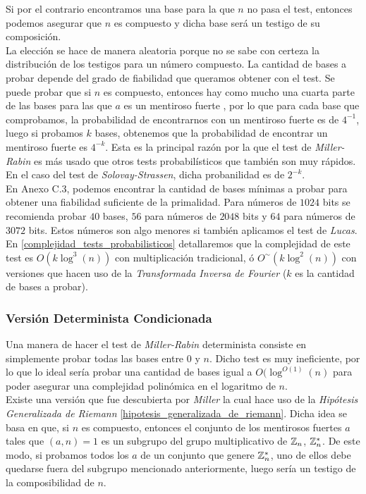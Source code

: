 Si por el contrario encontramos una base para la que $n$ no pasa el test, entonces podemos asegurar que $n$ es compuesto y dicha base será un testigo de su composición.\\

La elección se hace de manera aleatoria porque no se sabe con certeza la distribución de los testigos para un número compuesto. La cantidad de bases a probar depende del grado de fiabilidad que queramos obtener con el test. Se puede probar que si $n$ es compuesto, entonces hay como mucho una cuarta parte de las bases para las que $a$ es un mentiroso fuerte \cite{rabin_1980}, por lo que para cada base que comprobamos, la probabilidad de encontrarnos con un mentiroso fuerte es de $4^{-1}$, luego si probamos $k$ bases, obtenemos que la probabilidad de encontrar un mentiroso fuerte es $4^{-k}$. Esta es la principal razón por la que el test de \textit{Miller-Rabin} es más usado que otros tests probabilísticos que también son muy rápidos. En el caso del test de \textit{Solovay-Strassen}, dicha probanilidad es de $2^{-k}$.\\

En \cite{digital_signature_standard} Anexo C.3, podemos encontrar la cantidad de bases mínimas a probar para obtener una fiabilidad suficiente de la primalidad. Para números de $1024$ bits se recomienda probar $40$ bases, $56$ para números de $2048$ bits y $64$ para números de $3072$ bits. Estos números son algo menores si también aplicamos el test de \textit{Lucas}.\\

En \autoref{complejidad_tests_probabilisticos} detallaremos que la complejidad de este test es $O(k\log^3(n))$ con multiplicación tradicional, ó $O^\sim(k\log^2(n))$ con versiones que hacen uso de la \textit{Transformada Inversa de Fourier} ($k$ es la cantidad de bases a probar).

\subsubsection{Versión Determinista Condicionada}

Una manera de hacer el test de \textit{Miller-Rabin} determinista consiste en simplemente probar todas las bases entre $0$ y $n$. Dicho test es muy ineficiente, por lo que lo ideal sería probar una cantidad de bases igual a $O(\log^{O(1)}(n)$ para poder asegurar una complejidad polinómica en el logaritmo de $n$.\\

Existe una versión que fue descubierta por \textit{Miller} la cual hace uso de la \textit{Hipótesis Generalizada de Riemann} \ref{hipotesis_generalizada_de_riemann}. Dicha idea se basa en que, si $n$ es compuesto, entonces el conjunto de los mentirosos fuertes $a$ tales que $(a, n) = 1$ es un subgrupo del grupo multiplicativo de $\mathbb{Z}_n$, $\mathbb{Z}_n^*$. De este modo, si probamos todos los $a$ de un conjunto que genere $\mathbb{Z}_n^*$, uno de ellos debe quedarse fuera del subgrupo mencionado anteriormente, luego sería un testigo de la composibilidad de $n$.\\

